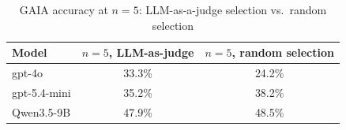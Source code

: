 \documentclass{article}
\begin{document}
\begin{table}[h]
\centering
\caption{GAIA accuracy at $n=5$: LLM-as-a-judge selection vs.\ random selection}
\label{tab:judge-vs-random}
\begin{tabular}{lcc}
\toprule
Model & $n=5$, LLM-as-judge & $n=5$, random selection \\
\midrule
gpt-4o       & 33.3\% & 24.2\% \\
gpt-5.4-mini & 35.2\% & 38.2\% \\
Qwen3.5-9B   & 47.9\% & 48.5\% \\
\bottomrule
\end{tabular}
\end{table}
\end{document}
